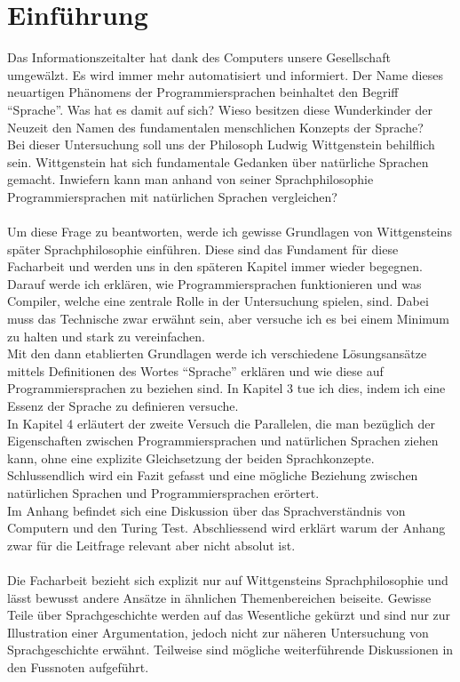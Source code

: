 \documentclass[10pt,a4paper]{article}
\begin{document}
\section{Einführung}
Das Informationszeitalter hat dank des Computers unsere Gesellschaft umgewälzt. Es wird immer mehr automatisiert und informiert. Der Name dieses neuartigen Phänomens der Programmiersprachen beinhaltet den Begriff \enquote{Sprache}. Was hat es damit auf sich? Wieso besitzen diese Wunderkinder der Neuzeit den Namen des fundamentalen menschlichen Konzepts der Sprache? \\
Bei dieser Untersuchung soll uns der Philosoph Ludwig Wittgenstein behilflich sein. Wittgenstein hat sich fundamentale Gedanken über natürliche Sprachen gemacht. Inwiefern kann man anhand von seiner Sprachphilosophie Programmiersprachen mit natürlichen Sprachen vergleichen? \\ \\
Um diese Frage zu beantworten, werde ich gewisse Grundlagen von Wittgensteins später Sprachphilosophie einführen. Diese sind das Fundament für diese Facharbeit und werden uns in den späteren Kapitel immer wieder begegnen. \\
Darauf werde ich erklären, wie Programmiersprachen funktionieren und was Compiler, welche eine zentrale Rolle in der Untersuchung spielen, sind. Dabei muss das Technische zwar erwähnt sein, aber versuche ich es bei einem Minimum zu halten und stark zu vereinfachen. \\ Mit den dann etablierten Grundlagen werde ich verschiedene Lösungsansätze mittels Definitionen des Wortes \enquote{Sprache} erklären und wie diese auf Programmiersprachen zu beziehen sind. In Kapitel 3 tue ich dies, indem ich eine Essenz der Sprache zu definieren versuche. \\ In Kapitel 4 erläutert der zweite Versuch die Parallelen, die man bezüglich der Eigenschaften zwischen Programmiersprachen und natürlichen Sprachen ziehen kann, ohne eine explizite Gleichsetzung der beiden Sprachkonzepte. \\ Schlussendlich wird ein Fazit gefasst und eine mögliche Beziehung zwischen natürlichen Sprachen und Programmiersprachen erörtert. \\ Im Anhang befindet sich eine Diskussion über das Sprachverständnis von Computern und den Turing Test. Abschliessend wird erklärt warum der Anhang zwar für die Leitfrage relevant aber nicht absolut ist. \\ \\
Die Facharbeit bezieht sich explizit nur auf Wittgensteins Sprachphilosophie und lässt bewusst andere Ansätze in ähnlichen Themenbereichen beiseite. Gewisse Teile über Sprachgeschichte werden auf das Wesentliche gekürzt und sind nur zur Illustration einer Argumentation, jedoch nicht zur näheren Untersuchung von Sprachgeschichte erwähnt. Teilweise sind mögliche weiterführende Diskussionen in den Fussnoten aufgeführt.
\end{document}
